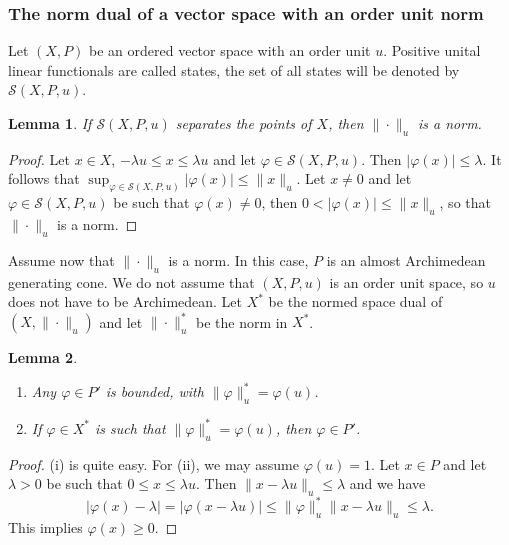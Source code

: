 \documentclass[12pt]{article}
\newtheorem{lemma}{Lemma}
\theoremstyle{remark}
\newcommand{\<}{\langle}
\begin{document}
\subsubsection*{The norm dual of a vector space with an order unit norm} 


Let $(X,P)$ be an ordered vector space with an order unit $u$. Positive unital linear functionals are called states, the set of all 
 states will be denoted by $\mathcal S(X,P,u)$.

\begin{lemma}\label{lemma:separates}
 If  $\mathcal S(X,P,u)$ separates the points of $X$, then $\|\cdot\|_u$ is a norm.

\end{lemma}

\begin{proof}
Let $x\in X$, $-\lambda u\le x\le \lambda u$ and let $\varphi\in \mathcal S(X,P,u)$. Then $|\varphi(x)|\le \lambda$. It follows that 
$\sup_{\varphi\in \mathcal S(X,P,u)} |\varphi(x)|\le \|x\|_u$. Let $x\neq 0$ and let $\varphi\in  \mathcal S(X,P,u)$ be such that 
$\varphi(x)\ne 0$, then $0<|\varphi(x)|\le \|x\|_u$, so that $\|\cdot\|_u$ is a norm.


\end{proof}



Assume now that $\|\cdot \|_u$ is a norm. In this case,  $P$ is an almost Archimedean generating  cone. We do not assume that $(X,P,u)$ is an order unit space, so $u$ does not have to be Archimedean. 
Let $X^*$ be the normed space dual of $(X, \|\cdot\|_u)$ and let $\|\cdot\|_u^*$ be the norm in $X^*$. 

\begin{lemma} 
\begin{enumerate}
\item[(i)] Any $\varphi\in P'$ is bounded, with $\|\varphi\|_u^*=\varphi(u)$.
\item[(ii)] If $\varphi\in X^*$ is such that $\|\varphi\|_u^*=\varphi(u)$, then $\varphi\in P'$.
\end{enumerate}


\end{lemma}
\begin{proof}
 (i) is quite easy. For (ii), we may assume $\varphi(u)=1$. Let $x\in P$ and let $\lambda>0$ be such that $0\le x\le \lambda u$. Then
 $\|x-\lambda u\|_u\le \lambda$ and we have
 \[
|\varphi(x)-\lambda|=|\varphi(x-\lambda u)|\le \|\varphi\|_u^*\|x-\lambda u\|_u\le \lambda.
 \]
This implies $\varphi(x)\ge 0$.

\end{proof}
\end{document}
